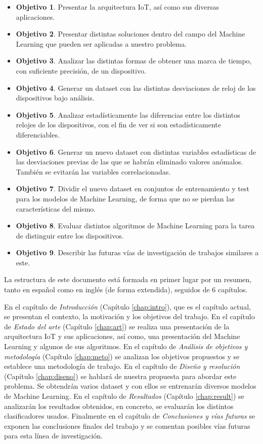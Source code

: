 \begin{itemize}
    \item \textbf{Objetivo 1}. Presentar la arquitectura IoT, así como sus diversas aplicaciones.
    \item \textbf{Objetivo 2}. Presentar distintas soluciones dentro del campo del Machine Learning que pueden ser aplicadas a nuestro problema.
    \item \textbf{Objetivo 3}. Analizar las distintas formas de obtener una marca de tiempo, con suficiente precisión, de un dispositivo.
    \item \textbf{Objetivo 4}. Generar un dataset con las distintas desviaciones de reloj de los dispositivos bajo análisis.
    \item \textbf{Objetivo 5}. Analizar estadísticamente las diferencias entre los distintos relojes de los dispositivos, con el fin de ver si son estadísticamente diferenciables.
    \item \textbf{Objetivo 6}. Generar un nuevo dataset con distintas variables estadísticas de las desviaciones previas de las que se habrán eliminado valores anómalos. También se evitarán las variables correlacionadas.
    \item \textbf{Objetivo 7}. Dividir el nuevo dataset en conjuntos de entrenamiento y test para los modelos de Machine Learning, de forma que no se pierdan las características del mismo.
    \item \textbf{Objetivo 8}. Evaluar distintos algoritmos de Machine Learning para la tarea de distinguir entre los dispositivos.
    \item \textbf{Objetivo 9}. Describir las futuras vías de investigación de trabajos similares a este.
\end{itemize}

La estructura de este documento está formada en primer lugar por un resumen, tanto en español como en inglés (de forma extendida), seguidos de 6 capítulos.

En el capítulo de \textit{Introducción} (Capítulo \ref{chap:intro}), que es el capítulo actual, se presentan el contexto, la motivación y los objetivos del trabajo. En el capítulo de \textit{Estado del arte} (Capítulo \ref{chap:art}) se realiza una presentación de la arquitectura IoT y sus aplicaciones, así como, una presentación del Machine Learning y algunos de sus algoritmos. En el capítulo de \textit{Análisis de objetivos y metodología} (Capítulo \ref{chap:meto}) se analizan los objetivos propuestos y se establece una metodología de trabajo. En el capítulo de \textit{Diseño y resolución} (Capítulo \ref{chap:diseno}) se hablará de nuestra propuesta para abordar este problema. Se obtendrán varios dataset y con ellos se entrenarán diversos modelos de Machine Learning. En el capítulo de \textit{Resultados} (Capítulo \ref{chap:result}) se analizarán los resultados obtenidos, en concreto, se evaluarán los distintos clasificadores usados. Finalmente en el capítulo de \textit{Conclusiones y vías futuras} se exponen las conclusiones finales del trabajo y se comentan posibles vías futuras para esta línea de investigación.

